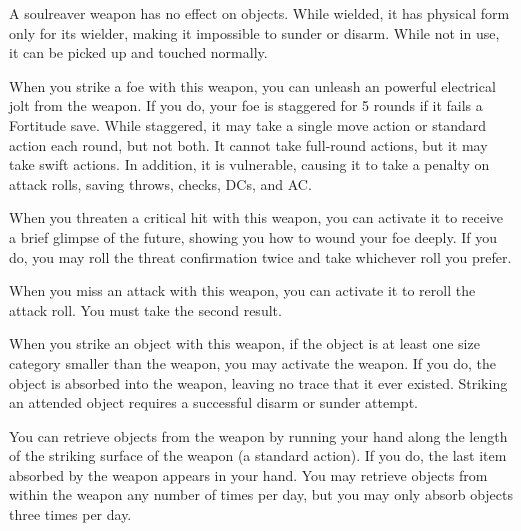A soulreaver weapon has no effect on objects. While wielded, it has physical form only for its wielder, making it impossible to sunder or disarm. While not in use, it can be picked up and touched normally.


 When you strike a foe with this weapon, you can unleash an powerful electrical jolt from the weapon. If you do, your foe is staggered for 5 rounds if it fails a Fortitude save. While staggered, it may take a single move action or standard action each round, but not both. It cannot take full-round actions, but it may take swift actions. In addition, it is vulnerable, causing it to take a  penalty on attack rolls, saving throws, checks, DCs, and AC.


 When you threaten a critical hit with this weapon, you can activate it to receive a brief glimpse of the future, showing you how to wound your foe deeply. If you do, you may roll the threat confirmation twice and take whichever roll you prefer.


 When you miss an attack with this weapon, you can activate it to reroll the attack roll. You must take the second result.


 When you strike an object with this weapon, if the object is at least one size category smaller than the weapon, you may activate the weapon. If you do, the object is absorbed into the weapon, leaving no trace that it ever existed. Striking an attended object requires a successful disarm or sunder attempt.

You can retrieve objects from the weapon by running your hand along the length of the striking surface of the weapon (a standard action). If you do, the last item absorbed by the weapon appears in your hand. You may retrieve objects from within the weapon any number of times per day, but you may only absorb objects three times per day.

